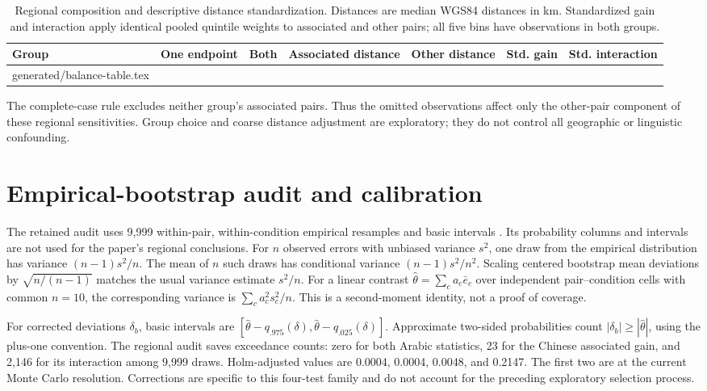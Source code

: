 \documentclass[12pt,a4paper]{article}
\makeatletter
\newcommand{\tableinput}[1]{\@@input #1 }
\makeatother
\begin{document}
\begin{table}[htbp]\centering\scriptsize
\caption{Regional composition and descriptive distance standardization. Distances are median WGS84 distances in km. Standardized gain and interaction apply identical pooled quintile weights to associated and other pairs; all five bins have observations in both groups.}
\begin{tabular}{lrrrrrr}\toprule Group & One endpoint & Both & Associated distance & Other distance & Std. gain & Std. interaction \\\midrule
\tableinput{generated/balance-table.tex}
\bottomrule\end{tabular}
\end{table}
The complete-case rule excludes neither group's associated pairs. Thus the omitted observations affect only the other-pair component of these regional sensitivities. Group choice and coarse distance adjustment are exploratory; they do not control all geographic or linguistic confounding.

\section{Empirical-bootstrap audit and calibration}\label{app:bootstrap}
The retained audit uses 9,999 within-pair, within-condition empirical resamples and basic intervals \cite{davison,scipyboot}. Its probability columns and intervals are not used for the paper's regional conclusions. For $n$ observed errors with unbiased variance $s^2$, one draw from the empirical distribution has variance $(n-1)s^2/n$. The mean of $n$ such draws has conditional variance $(n-1)s^2/n^2$. Scaling centered bootstrap mean deviations by $\sqrt{n/(n-1)}$ matches the usual variance estimate $s^2/n$. For a linear contrast $\hat\theta=\sum_c a_c\bar e_c$ over independent pair--condition cells with common $n=10$, the corresponding variance is $\sum_c a_c^2s_c^2/n$. This is a second-moment identity, not a proof of coverage.

For corrected deviations $\delta_b$, basic intervals are $[\hat\theta-q_{.975}(\delta),\hat\theta-q_{.025}(\delta)]$. Approximate two-sided probabilities count $|\delta_b|\geq|\hat\theta|$, using the plus-one convention. The regional audit saves exceedance counts: zero for both Arabic statistics, 23 for the Chinese associated gain, and 2,146 for its interaction among 9,999 draws. Holm-adjusted values are 0.0004, 0.0004, 0.0048, and 0.2147. The first two are at the current Monte Carlo resolution. Corrections are specific to this four-test family and do not account for the preceding exploratory selection process.
\end{document}
